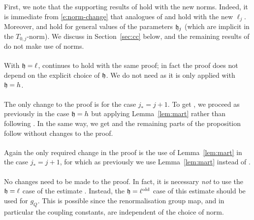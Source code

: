 First, we note that the supporting results of \cite[Section~\ref{IE-sec:W}]{BS-rg-IE} hold with the new norms.
Indeed,
it is immediate from \eqref{e:norm-change} that analogues of
\cite[Proposition~\ref{IE-prop:Wnorms}]{BS-rg-IE} and
\cite[Lemmas~\ref{IE-lem:epdV}, \ref{IE-lem:W-logwish}--\ref{IE-lem:Wbil}]{BS-rg-IE} hold with the new $\ell_j$.
Moreover, \cite[Lemma~\ref{IE-lem:Fpibd-bis}]{BS-rg-IE} and \cite[Proposition~\ref{IE-prop:Wbounds}]{BS-rg-IE} hold
for general values of the parameters $\mathfrak{h}_j$ (which are implicit in the $T_{0,j}$-norm).
We discuss \cite[Proposition~\ref{IE-prop:1-LTdefXY}]{BS-rg-IE}
in Section~\ref{sec:cc} below,
and the remaining results of \cite[Section~\ref{IE-sec:W}]{BS-rg-IE} do not make use of norms.

\paragraph{\cite[Proposition~\ref{IE-prop:Iupper}]{BS-rg-IE}}
With $\mathfrak{h} = \ell$, \cite[\eqref{IE-e:Iupper-a}]{BS-rg-IE} continues to hold with the same proof;
in fact the proof does not depend on the explicit choice of $\mathfrak{h}$.
We do not need \cite[\eqref{IE-e:Iupper-b}]{BS-rg-IE} as it is only applied with $\mathfrak{h} = h$.

\paragraph{\cite[Proposition~\ref{IE-prop:Istab}]{BS-rg-IE}}
The only change to the proof is for the case $j_* = j + 1$.
To get \cite[\eqref{IE-e:IF}]{BS-rg-IE},
we proceed as previously in the case $\mathfrak{h}=h$ but applying Lemma~\ref{lem:mart}
rather than \cite[Lemma~\ref{IE-lem:mart}]{BS-rg-IE} following \cite[(5.22)]{BS-rg-IE}.
In the same way, we get \cite[\eqref{IE-e:Iass}]{BS-rg-IE} and the remaining parts of
the proposition follow without changes to the proof.

\paragraph{\cite[Proposition~\ref{IE-prop:Ianalytic1:5}]{BS-rg-IE}}
Again the only required change in the proof is the use of
Lemma~\ref{lem:mart} in the case $j_* = j + 1$,
for which as previously we use Lemma~\ref{lem:mart} instead of \cite[Lemma~\ref{IE-lem:mart}]{BS-rg-IE}.

\paragraph{\cite[Proposition~\ref{IE-prop:JCK-app-1}]{BS-rg-IE}}
No changes need to be made to the proof.
In fact, it is necessary \emph{not} to use the $\mathfrak{h} = \ell$ case
of the estimate \cite[(5.32)]{BS-rg-IE}. Instead, the
$\mathfrak{h} = \ell^{\mathrm{old}}$ case of this estimate should be used for $g_Q$.
This is possible since the renormalisation
group map, and in particular the coupling constants, are independent of the choice of norm.

